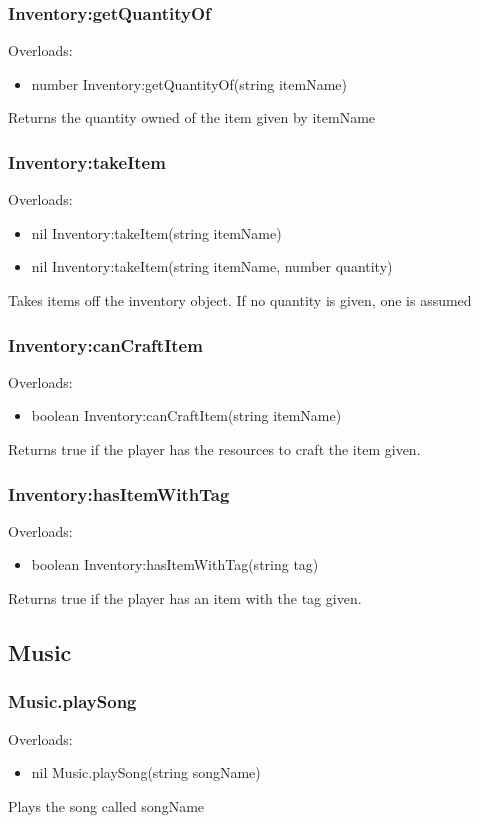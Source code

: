 \documentclass{book}
\newenvironment{ulist}
	{\begin{itemize}
			\itemsep0em}
	{\end{itemize}}
\begin{document}
\subsubsection{Inventory:getQuantityOf}
Overloads:
\begin{ulist}
	\item number Inventory:getQuantityOf(string itemName)
\end{ulist}
Returns the quantity owned of the item given by itemName

\subsubsection{Inventory:takeItem}
Overloads:
\begin{ulist}
	\item nil Inventory:takeItem(string itemName)
	\item nil Inventory:takeItem(string itemName, number quantity)
\end{ulist}
Takes items off the inventory object. If no quantity is given, one is assumed

\subsubsection{Inventory:canCraftItem}
Overloads:
\begin{ulist}
	\item boolean Inventory:canCraftItem(string itemName)
\end{ulist}
Returns true if the player has the resources to craft the item given.

\subsubsection{Inventory:hasItemWithTag}
Overloads:
\begin{ulist}
	\item boolean Inventory:hasItemWithTag(string tag)
\end{ulist}
Returns true if the player has an item with the tag given.

\subsection{Music}
\subsubsection{Music.playSong}
Overloads:
\begin{ulist}
	\item nil Music.playSong(string songName)
\end{ulist}
Plays the song called songName
\end{document}
